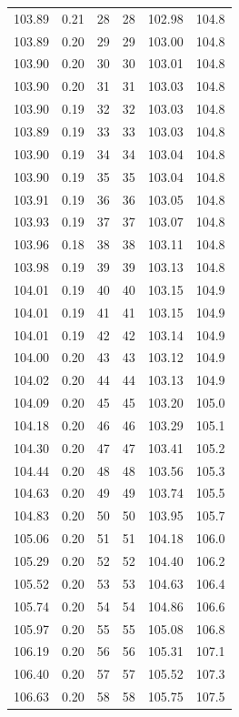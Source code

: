\documentclass[
]{article}
\begin{document}
\begin{longtable}[]{@{}rrrrrr@{}}
103.89 & 0.21 & 28 & 28 & 102.98 & 104.8 \\
103.89 & 0.20 & 29 & 29 & 103.00 & 104.8 \\
103.90 & 0.20 & 30 & 30 & 103.01 & 104.8 \\
103.90 & 0.20 & 31 & 31 & 103.03 & 104.8 \\
103.90 & 0.19 & 32 & 32 & 103.03 & 104.8 \\
103.89 & 0.19 & 33 & 33 & 103.03 & 104.8 \\
103.90 & 0.19 & 34 & 34 & 103.04 & 104.8 \\
103.90 & 0.19 & 35 & 35 & 103.04 & 104.8 \\
103.91 & 0.19 & 36 & 36 & 103.05 & 104.8 \\
103.93 & 0.19 & 37 & 37 & 103.07 & 104.8 \\
103.96 & 0.18 & 38 & 38 & 103.11 & 104.8 \\
103.98 & 0.19 & 39 & 39 & 103.13 & 104.8 \\
104.01 & 0.19 & 40 & 40 & 103.15 & 104.9 \\
104.01 & 0.19 & 41 & 41 & 103.15 & 104.9 \\
104.01 & 0.19 & 42 & 42 & 103.14 & 104.9 \\
104.00 & 0.20 & 43 & 43 & 103.12 & 104.9 \\
104.02 & 0.20 & 44 & 44 & 103.13 & 104.9 \\
104.09 & 0.20 & 45 & 45 & 103.20 & 105.0 \\
104.18 & 0.20 & 46 & 46 & 103.29 & 105.1 \\
104.30 & 0.20 & 47 & 47 & 103.41 & 105.2 \\
104.44 & 0.20 & 48 & 48 & 103.56 & 105.3 \\
104.63 & 0.20 & 49 & 49 & 103.74 & 105.5 \\
104.83 & 0.20 & 50 & 50 & 103.95 & 105.7 \\
105.06 & 0.20 & 51 & 51 & 104.18 & 106.0 \\
105.29 & 0.20 & 52 & 52 & 104.40 & 106.2 \\
105.52 & 0.20 & 53 & 53 & 104.63 & 106.4 \\
105.74 & 0.20 & 54 & 54 & 104.86 & 106.6 \\
105.97 & 0.20 & 55 & 55 & 105.08 & 106.8 \\
106.19 & 0.20 & 56 & 56 & 105.31 & 107.1 \\
106.40 & 0.20 & 57 & 57 & 105.52 & 107.3 \\
106.63 & 0.20 & 58 & 58 & 105.75 & 107.5 \\

\end{longtable}
\end{document}
